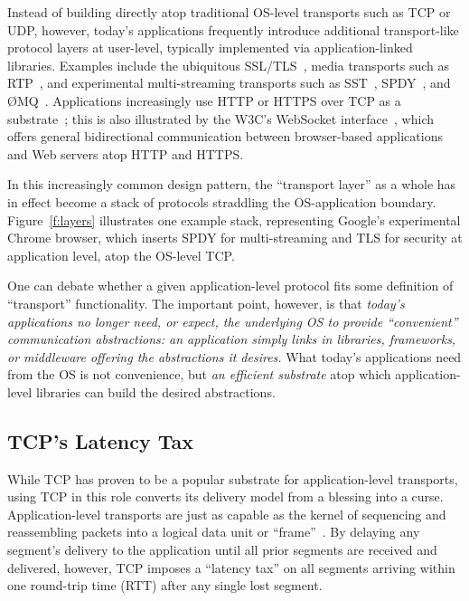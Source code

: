 Instead of building directly atop
traditional OS-level transports such as TCP or UDP, however,
today's applications
frequently introduce additional transport-like
protocol layers at user-level,
typically implemented via application-linked libraries.
Examples include the ubiquitous SSL/TLS~\cite{rfc5246},
media transports such as RTP~\cite{rfc3550},
and experimental multi-streaming transports such as
SST~\cite{ford07structured}, SPDY~\cite{spdy},
and \O{}MQ~\cite{zeromq}.
Applications increasingly use HTTP or HTTPS over TCP
as a substrate~\cite{popa10http};
this is also illustrated by 
the W3C's WebSocket interface~\cite{websocket},
which offers general bidirectional communication
between browser-based applications and Web servers atop HTTP and HTTPS.

In this increasingly common design pattern,
the ``transport layer'' as a whole has in effect become
a stack of protocols straddling the OS-application boundary.
Figure~\ref{f:layers} illustrates one example stack,
representing Google's experimental Chrome browser,
which inserts SPDY for multi-streaming and TLS for security
at application level,
atop the OS-level TCP.

One can debate whether a given application-level protocol
fits some definition of ``transport'' functionality.
The important point, however,
is that {\em today's applications no longer need, or expect,
the underlying OS to provide ``convenient'' communication abstractions:
an application simply links in libraries, frameworks,
or middleware offering the abstractions it desires.}
What today's applications
need from the OS is not convenience,
but {\em an efficient substrate}
atop which application-level libraries
can build the desired abstractions.

\subsection{TCP's Latency Tax}

While TCP has proven to be a popular
substrate for application-level transports,
using TCP in this role
converts its delivery model from a blessing into a curse.
Application-level transports are just as capable as the kernel
of sequencing and reassembling packets into
a logical data unit or ``frame''~\cite{clark90architectural}.
By delaying any segment's delivery to the application
until all prior segments are received and delivered, however,
TCP imposes a ``latency tax'' on all segments
arriving within one round-trip time (RTT) after any single lost segment.

